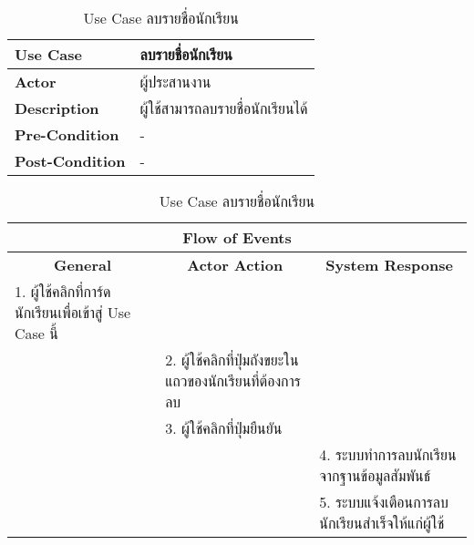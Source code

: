 \begin{table}[H]
    \caption{Use Case ลบรายชื่อนักเรียน}
    \label{tab:usecase-remove-student}
    \begin{tabularx}{\textwidth}{ | p{3cm} | X | }
    \hline
    \textbf{Use Case} & ลบรายชื่อนักเรียน \\
    \hline
    \textbf{Actor} & ผู้ประสานงาน \\
    \hline
    \textbf{Description} & ผู้ใช้สามารถลบรายชื่อนักเรียนได้ \\
    \hline
    \textbf{Pre-Condition} & - \\
    \hline
    \textbf{Post-Condition} & - \\
    \hline
    \end{tabularx}
    \begin{tabularx}{\textwidth}{ | X | X | X | }
    \multicolumn{3}{|c|}{\textbf{Flow of Events}} \\
    \hline
    \multicolumn{1}{|c|}{\textbf{General}} & \multicolumn{1}{|c|}{\textbf{Actor Action}} & \multicolumn{1}{|c|}{\textbf{System Response}} \\
    \hline
    1. ผู้ใช้คลิกที่การ์ดนักเรียนเพื่อเข้าสู่ Use Case นี้ & & \\
    \hline
    & 2. ผู้ใช้คลิกที่ปุ่มถังขยะในแถวของนักเรียนที่ต้องการลบ & \\
    \hline
    & 3. ผู้ใช้คลิกที่ปุ่มยืนยัน & \\
    \hline
    & & 4. ระบบทำการลบนักเรียนจากฐานข้อมูลสัมพันธ์ \\
    \hline
    & & 5. ระบบแจ้งเตือนการลบนักเรียนสำเร็จให้แก่ผู้ใช้ \\
    \hline
    \end{tabularx}
\end{table}
